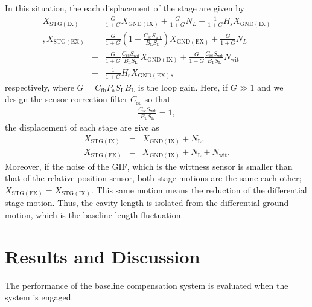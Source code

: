 In this situation, the each displacement of the stage are given by 
\begin{eqnarray}
  X_{\mathrm{STG(IX)}} &=& \displaystyle\frac{G}{1+G} X_{\mathrm{GND(IX)}} + \frac{G}{1+G} N_{L} + \frac{1}{1+G} H_{\mathrm{s}} X_{\mathrm{GND(IX)}} \\ \nonumber,
  X_{\mathrm{STG(EX)}} &=& \displaystyle\frac{G}{1+G} \left(1- \frac{C_{\mathrm{sc}}S_{\mathrm{wit}}}{B_{\mathrm{L}}S_{\mathrm{L}}}\right) X_{\mathrm{GND(EX)}} + \frac{G}{1+G}N_{L} \\ \nonumber
  &+& \frac{G}{1+G} \frac{C_{\mathrm{sc}}S_{\mathrm{wit}}} {B_{\mathrm{L}}S_{\mathrm{L}}} X_{\mathrm{GND(IX)}}
  + \frac{G}{1+G} \frac{C_{\mathrm{sc}}S_{\mathrm{wit}}} {B_{\mathrm{L}}S_{\mathrm{L}}} N_{\mathrm{wit}}\\ 
  &+& \frac{1}{1+G} H_{\mathrm{s}} X_{\mathrm{GND(EX)}},
\end{eqnarray}
respectively, where $G=C_{\mathrm{fb}}P_{\mathrm{a}}S_{\mathrm{L}}B_{\mathrm{L}}$ is the loop gain. Here, if $G\gg1$ and we design the sensor correction filter $C_{\mathrm{sc}}$ so that
\begin{eqnarray}
  \frac{C_{\mathrm{sc}}S_{\mathrm{wit}}}{B_{\mathrm{L}}S_{\mathrm{L}}} = 1,
\end{eqnarray}
the displacement of each stage are give as 
\begin{eqnarray}
  X_{\mathrm{STG(IX)}} &=& X_{\mathrm{GND(IX)}} + N_{\mathrm{L}},\\
  X_{\mathrm{STG(EX)}} &=& X_{\mathrm{GND(IX)}} + N_{\mathrm{L}} + N_{\mathrm{wit}}.
\end{eqnarray}
Moreover, if the noise of the GIF, which is the wittness sensor is smaller than that of the relative position sensor, both stage motions are the same each other; $X_{\mathrm{STG(EX)}}=X_{\mathrm{STG(IX)}}$. This same motion means the reduction of the differential stage motion. Thus, the cavity length is isolated from the differential ground motion, which is the baseline length fluctuation.




\section{Results and Discussion } \label{sec:sec52}
The performance of the baseline compensation system is evaluated when the system is engaged.

